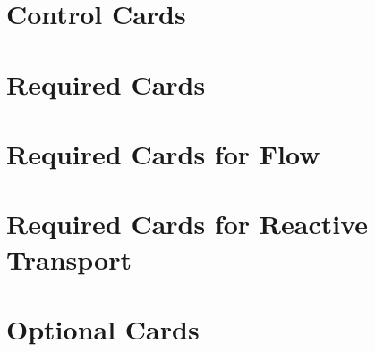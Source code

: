 \documentclass{beamer}
\begin{document}
\section{Control Cards}



\section{Required Cards}








\section{Required Cards for Flow}


\section{Required Cards for Reactive Transport}




\section{Optional Cards}



\end{document}

